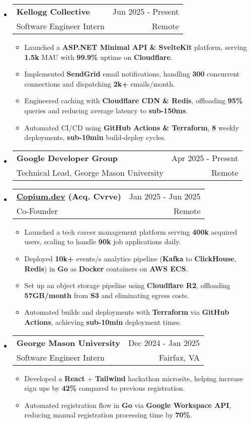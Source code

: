 \documentclass[letterpaper,11pt]{article}
\makeatletter
\newcommand{\resumeItem}[1]{
  \item{
    {#1}
  }
}
\newcommand{\resumeSubheading}[4]{
    \item
    \begin{tabular*}{0.985\textwidth}[t]{l@{\extracolsep{\fill}}r@{\hspace{-0.1in}}}
        {\textbf{#1}} & {#2} \\
        #3 &  #4 \\
    \end{tabular*}\vspace{-5pt}
}
\newcommand{\resumeSubHeadingListStart}{\begin{itemize}[leftmargin=0.00in, rightmargin=-0.2in, label={}]\vspace{3pt}}
\newcommand{\resumeSubHeadingListEnd}{\end{itemize}\vspace{-5pt}}
\newcommand{\resumeItemListStart}{\vspace{3pt}\begin{itemize}[leftmargin=0.15in, rightmargin=0.15in]}
\newcommand{\resumeItemListEnd}{\end{itemize}\vspace{-5pt}}
\makeatother
\begin{document}
\resumeSubHeadingListStart
\resumeSubheading
{Kellogg Collective} {Jun 2025 - Present}
{Software Engineer Intern} {Remote}
\resumeItemListStart
\resumeItem{Launched a \textbf{ASP.NET Minimal API \& SvelteKit} platform, serving \textbf{1.5k} MAU with \textbf{99.9\%} uptime on \textbf{Cloudflare}.}
\resumeItem{Implemented \textbf{SendGrid} email notifications, handling \textbf{300} concurrent connections and dispatching \textbf{2k+} emails/month.}
\resumeItem{Engineered caching with \textbf{Cloudflare CDN \& Redis}, offloading \textbf{95\%} queries and reducing average latency to \textbf{sub-150ms}.}
\resumeItem{Automated CI/CD using \textbf{GitHub Actions \& Terraform}, \textbf{8} weekly deployments, \textbf{sub-10min} build-deploy cycles.}
\resumeItemListEnd
\resumeSubHeadingListEnd

\resumeSubHeadingListStart
\resumeSubheading
{Google Developer Group} {Apr 2025 - Present}
{Technical Lead, George Mason University} {Remote}
\resumeSubHeadingListEnd

\resumeSubHeadingListStart
\resumeSubheading
{\href{https://www.copium.dev}{Copium.dev} (Acq. Cvrve)} {Jan 2025 - Jun 2025}
{Co-Founder} {Remote}
\resumeItemListStart
\resumeItem{Launched a tech career management platform serving \textbf{400k} acquired users, scaling to handle \textbf{90k} job applications daily.}
\resumeItem{Deployed \textbf{10k+} events/s analytics pipeline (\textbf{Kafka} to \textbf{ClickHouse}, \textbf{Redis}) in \textbf{Go} as \textbf{Docker} containers on \textbf{AWS ECS}.}
\resumeItem{Set up an object storage pipeline using \textbf{Cloudflare R2}, offloading \textbf{57GB/month} from \textbf{S3} and eliminating egress costs.}
\resumeItem{Automated builds and deployments with \textbf{Terraform} via \textbf{GitHub Actions}, achieving \textbf{sub-10min} deployment times.}
\resumeItemListEnd
\resumeSubHeadingListEnd

\resumeSubHeadingListStart
\resumeSubheading
{George Mason University} {Dec 2024 - Jan 2025}
{Software Engineer Intern} {Fairfax, VA}
\resumeItemListStart
\resumeItem{Developed a \textbf{React} + \textbf{Tailwind} hackathon microsite, helping increase sign ups by \textbf{42\%} compared to previous registration.}
\resumeItem{Automated registration flow in \textbf{Go} via \textbf{Google Workspace API}, reducing manual registration processing time by \textbf{70\%}.}
\resumeItemListEnd
\resumeSubHeadingListEnd
\end{document}
